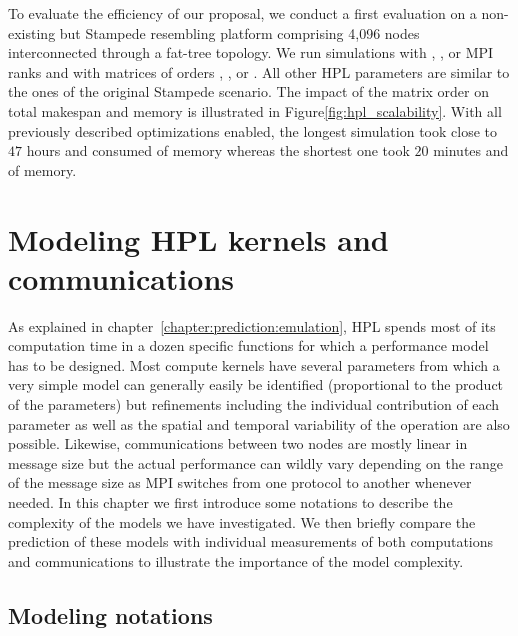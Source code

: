         To evaluate the efficiency of our proposal, we conduct a first evaluation on a non-existing but Stampede
        resembling platform comprising 4,096 nodes interconnected through a fat-tree topology.
        We run simulations with , ,  or  MPI ranks and with matrices of orders
        , ,  or . All other HPL parameters are similar to the ones of the original
        Stampede scenario.  The impact of the matrix order on total makespan and memory is illustrated in
        Figure\ref{fig:hpl_scalability}.  With all previously described optimizations enabled, the longest simulation
        took close to \(47\) hours and consumed  of memory whereas the shortest one took \(20\)
        minutes and  of memory.

\chapter{Modeling HPL kernels and communications}%
\label{chapter:prediction:modeling}

    As explained in chapter~\ref{chapter:prediction:emulation}, HPL spends most of its computation time in a dozen specific
    functions for which a performance model has to be designed. Most compute kernels have several parameters from which
    a very simple model can generally easily be identified (\eg proportional to the product of the parameters) but
    refinements including the individual contribution of each parameter as well as the spatial and temporal variability
    of the operation are also possible. Likewise, communications between two nodes are mostly linear in message size but
    the actual performance can wildly vary depending on the range of the message size as MPI switches from one
    protocol to another whenever needed. In this chapter we first introduce some notations to describe the complexity of
    the models we have investigated. We then briefly compare the prediction of these models with individual measurements
    of both computations and communications to illustrate the importance of the model complexity.

    \section{Modeling notations}%

